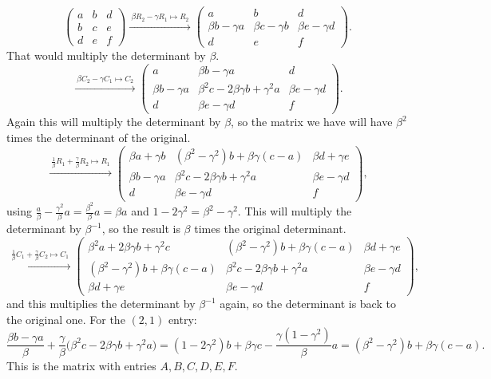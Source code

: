 \begin{calc}
\[
\begin{pmatrix} a & b & d \\ b & c & e \\ d & e & f \end{pmatrix}
\xrightarrow{\ \beta R_2 - \gamma R_1 \mapsto R_2\ }
\begin{pmatrix} a & b & d \\ \beta b - \gamma a & \beta c - \gamma b & \beta e - \gamma d \\ d & e & f \end{pmatrix}.
\]
That would multiply the determinant by $\beta$.
\[
\xrightarrow{\ \beta C_2 - \gamma C_1 \mapsto C_2\ }
\begin{pmatrix} a & \beta b - \gamma a & d \\ \beta b - \gamma a & \beta^2 c - 2\beta\gamma b + \gamma^2 a & \beta e - \gamma d \\ d & \beta e - \gamma d & f \end{pmatrix}.
\]
Again this will multiply the determinant by $\beta$, so the matrix we have will have $\beta^2$ times the determinant of the original.
\[
\xrightarrow{\ \frac1\beta R_1 + \frac\gamma\beta R_2 \mapsto R_1\ }
\begin{pmatrix} \beta a + \gamma b & (\beta^2 - \gamma^2)b + \beta\gamma(c - a) & \beta d + \gamma e \\ \beta b - \gamma a & \beta^2 c - 2\beta\gamma b + \gamma^2 a & \beta e - \gamma d \\ d & \beta e - \gamma d & f \end{pmatrix},
\]
using $\frac{a}{\beta} - \frac{\gamma^2}{\beta}a = \frac{\beta^2}{\beta}a = \beta a$ and $1 - 2\gamma^2 = \beta^2 - \gamma^2$. This will multiply the determinant by $\beta^{-1}$, so the result is $\beta$ times the original determinant.
\[
\xrightarrow{\ \frac1\beta C_1 + \frac\gamma\beta C_2 \mapsto C_1\ }
\begin{pmatrix} \beta^2 a + 2\beta\gamma b + \gamma^2 c & (\beta^2 - \gamma^2)b + \beta\gamma(c - a) & \beta d + \gamma e \\ (\beta^2 - \gamma^2)b + \beta\gamma(c - a) & \beta^2 c - 2\beta\gamma b + \gamma^2 a & \beta e - \gamma d \\ \beta d + \gamma e & \beta e - \gamma d & f \end{pmatrix},
\]
and this multiplies the determinant by $\beta^{-1}$ again, so the determinant is back to the original one. For the $(2,1)$ entry:
\[
\frac{\beta b - \gamma a}{\beta} + \frac{\gamma}{\beta}\big(\beta^2 c - 2\beta\gamma b + \gamma^2 a\big)
= (1 - 2\gamma^2)b + \beta\gamma c - \frac{\gamma(1 - \gamma^2)}{\beta}a
= (\beta^2 - \gamma^2)b + \beta\gamma(c - a).
\]
This is the matrix with entries $A, B, C, D, E, F$.


\end{calc}
